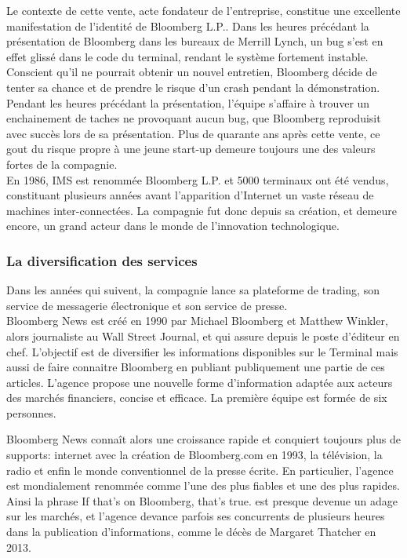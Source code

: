 \documentclass[11pt, oneside, titlepage, a4paper]{article}
\begin{document}
Le contexte de cette vente, acte fondateur de l'entreprise, constitue une excellente manifestation de l'identité de Bloomberg L.P.. Dans les heures précédant la présentation de Bloomberg dans les bureaux de Merrill Lynch, un bug s'est en effet glissé dans le code du terminal, rendant le système fortement instable. Conscient qu'il ne pourrait obtenir un nouvel entretien, Bloomberg décide de tenter sa chance et de prendre le risque d'un crash pendant la démonstration. Pendant les heures précédant la présentation, l'équipe s'affaire à trouver un enchainement de taches ne provoquant aucun bug, que Bloomberg reproduisit avec succès lors de sa présentation. Plus de quarante ans après cette vente, ce gout du risque propre à une jeune start-up demeure toujours une des valeurs fortes de la compagnie.
\\

En 1986, IMS est renommée Bloomberg L.P. et 5000 terminaux ont été vendus, constituant plusieurs années avant l'apparition d'Internet un vaste réseau de machines inter-connectées. La compagnie fut donc depuis sa création, et demeure encore, un grand acteur dans le monde de l'innovation technologique.
		\subsubsection{La diversification des services}
Dans les années qui suivent, la compagnie lance sa plateforme de trading, son service de messagerie électronique et son service de presse.
\\

Bloomberg News est créé en 1990 par Michael Bloomberg et Matthew Winkler, alors journaliste au Wall Street Journal, et qui assure depuis le poste d'éditeur en chef. L'objectif est de diversifier les informations disponibles sur le Terminal mais aussi de faire connaitre Bloomberg en publiant publiquement une partie de ces articles. L'agence propose une nouvelle forme d'information adaptée aux acteurs des marchés financiers, concise et efficace. La première équipe est formée de six personnes.

Bloomberg News connaît alors une croissance rapide et conquiert toujours plus de supports: internet avec la création de Bloomberg.com en 1993, la télévision, la radio et enfin le monde conventionnel de la presse écrite. En particulier, l'agence est mondialement renommée comme l'une des plus fiables et une des plus rapides. Ainsi la phrase \og If that's on Bloomberg, that's true.\fg{} est presque devenue un adage sur les marchés, et l'agence devance parfois ses concurrents de plusieurs heures dans la publication d'informations, comme le décès de Margaret Thatcher en 2013.
\end{document}
